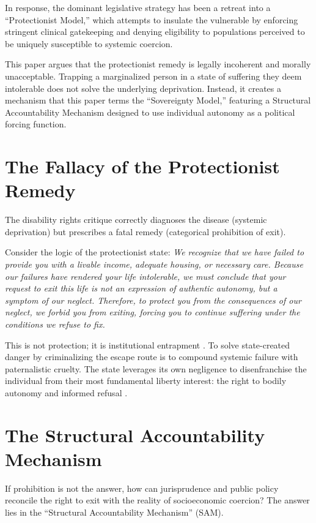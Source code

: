 \documentclass[10pt, twocolumn, letterpaper]{article}
\begin{document}
In response, the dominant legislative strategy has been a retreat into a ``Protectionist Model,'' which attempts to insulate the vulnerable by enforcing stringent clinical gatekeeping and denying eligibility to populations perceived to be uniquely susceptible to systemic coercion. 

This paper argues that the protectionist remedy is legally incoherent and morally unacceptable. Trapping a marginalized person in a state of suffering they deem intolerable does not solve the underlying deprivation. Instead, it creates a mechanism that this paper terms the ``Sovereignty Model,'' featuring a Structural Accountability Mechanism designed to use individual autonomy as a political forcing function.

\section{The Fallacy of the Protectionist Remedy}

The disability rights critique correctly diagnoses the disease (systemic deprivation) but prescribes a fatal remedy (categorical prohibition of exit).

Consider the logic of the protectionist state: \textit{We recognize that we have failed to provide you with a livable income, adequate housing, or necessary care. Because our failures have rendered your life intolerable, we must conclude that your request to exit this life is not an expression of authentic autonomy, but a symptom of our neglect. Therefore, to protect you from the consequences of our neglect, we forbid you from exiting, forcing you to continue suffering under the conditions we refuse to fix.}

This is not protection; it is institutional entrapment \cite{stefan2016}. To solve state-created danger by criminalizing the escape route is to compound systemic failure with paternalistic cruelty. The state leverages its own negligence to disenfranchise the individual from their most fundamental liberty interest: the right to bodily autonomy and informed refusal \cite{beauchamp2019}.

\section{The Structural Accountability Mechanism}

If prohibition is not the answer, how can jurisprudence and public policy reconcile the right to exit with the reality of socioeconomic coercion? The answer lies in the ``Structural Accountability Mechanism'' (SAM).
\end{document}
